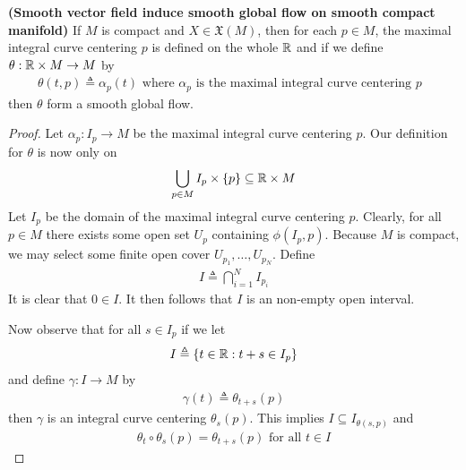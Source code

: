 \documentclass{report}
\begin{document}
\begin{theorem}
\textbf{(Smooth vector field induce smooth global flow on smooth compact manifold)} If $M$ is compact and  $X \in \mathfrak{X}(M)$, then for each $p\in  M$, the maximal integral curve centering $p$ is defined on the whole  $\mathbb{R}$ and if we define $\theta:\mathbb{R}\times M\rightarrow M$ by 
\begin{align*}
\theta (t,p)\triangleq \alpha _p(t)\text{ where }\alpha _p\text{ is the maximal integral curve centering $p$ }
\end{align*}
then $\theta$ form a smooth global flow.
\end{theorem}
\begin{proof}
Let $\alpha_p:I_p\rightarrow M$ be the maximal integral curve centering $p$. Our definition for $\theta$ is now only on 
\begin{align*}
\bigcup_{p\in M} I_p \times \{ p \}\subseteq \mathbb{R}\times M
\end{align*}
Let $I_p$ be the domain of the maximal integral curve centering $p$. Clearly, for all $p \in M$ there exists some open set $U_p$ containing $\phi(I_p,p)$. Because $M$ is compact, we may select some finite open cover $U_{p_1},\dots ,U_{p_N}$. Define 
\begin{align*}
I\triangleq \bigcap_{i=1}^N I_{p_i}
\end{align*}
It is clear that $0 \in I$. It then follows that $I$ is an non-empty open interval. 






Now observe that for all $s\in I_p$ if we let 
\begin{align*}
I\triangleq \{ t\in\mathbb{R}:t+s \in I_p \}
\end{align*}
and define $\gamma :I\rightarrow M$ by 
\begin{align*}
\gamma (t)\triangleq \theta_{t+s}(p)
\end{align*}
then $\gamma $ is an integral curve centering $\theta_s(p)$. This implies $I \subseteq I_{\theta (s,p)}$ and 
\begin{align*}
\theta_t \circ \theta_s (p)=\theta_{t+s}(p)\text{ for all }t \in I
\end{align*}
\end{proof}
\end{document}
